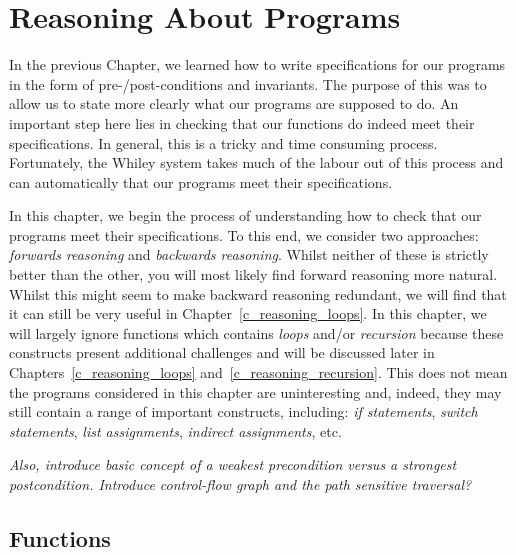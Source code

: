 \chapter{Reasoning About Programs}
In the previous Chapter, we learned how to write specifications for our programs in the form of pre-/post-conditions and invariants.  The purpose of this was to allow us to state more clearly what our programs are supposed to do.  An important step here lies in checking that our functions do indeed meet their specifications.  In general, this is a tricky and time consuming process.  Fortunately, the Whiley system takes much of the labour out of this process and can automatically that our programs meet their specifications.  

In this chapter, we begin the process of understanding how to check that our programs meet their specifications.  To this end, we consider two approaches: {\em forwards reasoning} and {\em backwards reasoning}.  Whilst neither of these is strictly better than the other, you will most likely find forward reasoning more natural.  Whilst this might seem to make backward reasoning redundant, we will find that it can still be very useful in Chapter~\ref{c_reasoning_loops}.  In this chapter, we will largely ignore functions which contains {\em loops} and/or {\em recursion} because these constructs present additional challenges and will be discussed later in Chapters~\ref{c_reasoning_loops} and~\ref{c_reasoning_recursion}.  This does not mean the programs considered in this chapter are uninteresting and, indeed, they may still contain a range of important constructs, including: {\em if statements}, {\em switch statements}, {\em list assignments}, {\em indirect assignments}, etc.

{\em Also, introduce basic concept of a weakest precondition versus a strongest postcondition.  Introduce control-flow graph and the path sensitive traversal?}

\section{Functions}
\label{r_functions}


